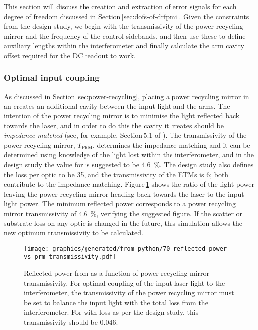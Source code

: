 This section will discuss the creation and extraction of error signals for each degree of freedom discussed in Section\,\ref{sec:dofs-of-drfpmi}. Given the constraints from the design study, we begin with the transmissivity of the power recycling mirror and the frequency of the control sidebands, and then use these to define auxiliary lengths within the interferometer and finally calculate the arm cavity offset required for the \gls{DC} readout to work.

\subsubsection{Optimal input coupling}
As discussed in Section\,\ref{sec:power-recycling}, placing a power recycling mirror in an \MI{} creates an additional cavity between the input light and the arms. The intention of the power recycling mirror is to minimise the light reflected back towards the laser, and in order to do this the cavity it creates should be \emph{impedance matched} (see, for example, Section\,5.1 of \cite{Freise2010}). The transmissivity of the power recycling mirror, $T_{\text{PRM}}$, determines the impedance matching and it can be determined using knowledge of the light lost within the interferometer, and in the \ET{} design study the value for \ETLF{} is suggested to be \SI{4.6}{\percent}. The design study also defines the loss per optic to be \SI{35}{\ppm}, and the transmissivity of the \glspl{ETM} is \SI{6}{\ppm}; both contribute to the impedance matching. Figure\,\ref{fig:reflected-power-vs-prm-trans} shows the ratio of the light power leaving the power recycling mirror heading back towards the laser to the input light power. The minimum reflected power corresponds to a power recycling mirror transmissivity of \SI{4.6}{\percent}, verifying the suggested figure. If the scatter or substrate loss on any optic is changed in the future, this simulation allows the new optimum transmissivity to be calculated.

\begin{figure}
  \centering
  \texttt{[image: graphics/generated/from-python/70-reflected-power-vs-prm-transmissivity.pdf]}
  \caption[Reflected power from \ETLF{} as a function of power recycling mirror transmissivity]{\label{fig:reflected-power-vs-prm-trans}Reflected power from \ETLF{} as a function of power recycling mirror transmissivity. For optimal coupling of the input laser light to the interferometer, the transmissivity of the power recycling mirror must be set to balance the input light with the total loss from the interferometer. For \ETLF{} with loss as per the design study, this transmissivity should be \num{0.046}.}
\end{figure}

